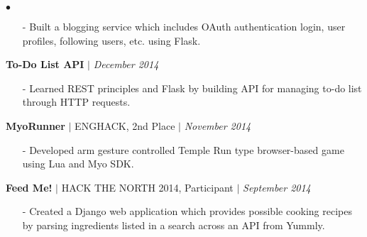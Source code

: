 \documentclass[10pt]{article}
\newenvironment{achievements}{\begin{list}{$\bullet$}{\topsep 0pt \itemsep -1.5pt \leftmargin 5pt}}{\vspace*{4pt}\end{list}}
\begin{document}
\begin{achievements}
\begin{itemize}
\item[-]Built a blogging service which includes OAuth authentication login, user profiles, following users, etc. using Flask.
\end{itemize}
\vspace{2pt}
\item \textbf{To-Do List API} $|$  \href{https://github.com/nakulpathak3/flask-rest-api}{\faGithub} \hfill \textit {December 2014}
\begin{itemize}
\item[-]Learned REST principles and Flask by building API for managing to-do list through HTTP requests.
\end{itemize}
\vspace{2pt}
\item\textbf{MyoRunner} {$|$ \scriptsize ENGHACK, 2nd Place }  $|$  \href{https://github.com/nakulpathak3/myorunner}{\faGithub} \hfill \textit {November 2014}
\begin{itemize}
\item[-]Developed arm gesture controlled Temple Run type browser-based game using Lua and Myo SDK.
\end{itemize}
\vspace{2pt}
\item \textbf{Feed Me!} {$|$ \scriptsize HACK THE NORTH 2014, Participant}   $|$  \href{https://github.com/nakulpathak3/FeedMe}{\faGithub} \hfill \textit {September 2014}
\begin{itemize}
\item[-]Created a Django web application which provides possible cooking recipes by parsing ingredients listed in a search across an API from Yummly.
\end{itemize}
\end{achievements}

\vspace{8pt}
\end{document}
